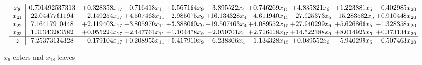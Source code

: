 \documentclass[10pt]{article}
\begin{document}
\[\begin{array}{c| c c@{\hskip 2pt} c@{\hskip 2pt} c@{\hskip 2pt} c@{\hskip 2pt} c@{\hskip 2pt} c@{\hskip 2pt} c@{\hskip 2pt} c@{\hskip 2pt} }
 x_{8}   &  0.701492537313 & + 0.328358 x_{17} & -0.716418 x_{11} & + 0.567164 x_{9} & -3.895522 x_{4} & + 0.746269 x_{15} & + 4.835821 x_{6} & + 1.223881 x_{5} & -0.402985 x_{20}\\
 x_{21}   &  22.0447761194 & -2.149254 x_{17} & + 4.507463 x_{11} & -2.985075 x_{9} & + 16.134328 x_{4} & -4.611940 x_{15} & -27.925373 x_{6} & -15.283582 x_{5} & + 0.910448 x_{20}\\
 x_{22}   &  7.16417910448 & + 2.119403 x_{17} & -3.805970 x_{11} & + 3.388060 x_{9} & -19.507463 x_{4} & + 4.089552 x_{15} & + 27.940299 x_{6} & + 5.626866 x_{5} & -1.328358 x_{20}\\
 x_{23}   &  1.31343283582 & + 0.955224 x_{17} & -2.447761 x_{11} & + 1.104478 x_{9} & -2.059701 x_{4} & + 2.716418 x_{15} & + 14.522388 x_{6} & + 8.014925 x_{5} & + 0.373134 x_{20}\\
\hline
z    &  7.25373134328 & -0.179104 x_{17} & + 0.208955 x_{11} & + 0.417910 x_{9} & -6.238806 x_{4} & -1.134328 x_{15} & + 0.089552 x_{6} & -5.940299 x_{5} & -0.507463 x_{20}\\
\end{array}\]


 $ x_{6} $ enters and $ x_{18} $ leaves 
\end{document}
